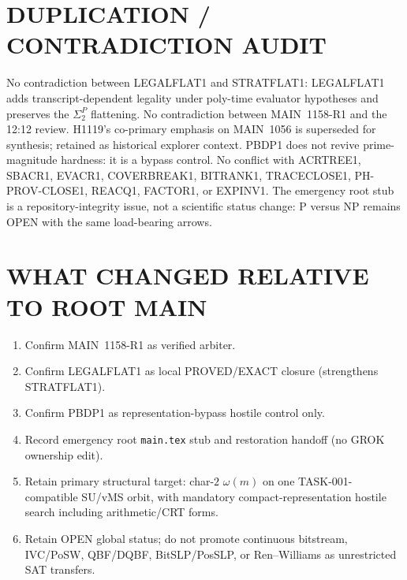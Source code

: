 \documentclass[11pt]{article}
\begin{document}
\section*{DUPLICATION / CONTRADICTION AUDIT}
No contradiction between LEGALFLAT1 and STRATFLAT1: LEGALFLAT1 adds transcript-dependent
legality under poly-time evaluator hypotheses and preserves the $\Sigma_2^P$ flattening.
No contradiction between MAIN~1158-R1 and the 12:12 review.
H1119's co-primary emphasis on MAIN~1056 is superseded for synthesis; retained as historical
explorer context. PBDP1 does not revive prime-magnitude hardness: it is a bypass control.
No conflict with ACRTREE1, SBACR1, EVACR1, COVERBREAK1, BITRANK1, TRACECLOSE1,
PH-PROV-CLOSE1, REACQ1, FACTOR1, or EXPINV1.
The emergency root stub is a repository-integrity issue, not a scientific status change:
P versus NP remains OPEN with the same load-bearing arrows.

\section*{WHAT CHANGED RELATIVE TO ROOT MAIN}
\begin{enumerate}
\item Confirm MAIN~1158-R1 as verified arbiter.
\item Confirm LEGALFLAT1 as local PROVED/EXACT closure (strengthens STRATFLAT1).
\item Confirm PBDP1 as representation-bypass hostile control only.
\item Record emergency root \texttt{main.tex} stub and restoration handoff (no GROK ownership edit).
\item Retain primary structural target: char-$2$ $\omega(m)$ on one TASK-001-compatible
SU/vMS orbit, with mandatory compact-representation hostile search including arithmetic/CRT forms.
\item Retain OPEN global status; do not promote continuous bitstream, IVC/PoSW, QBF/DQBF,
BitSLP/PosSLP, or Ren--Williams as unrestricted SAT transfers.
\end{enumerate}
\end{document}
